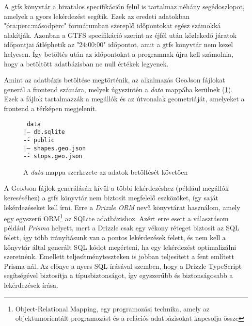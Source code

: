 A gtfs könyvtár a hivatalos specifikáción felül is tartalmaz néhány segédoszlopot, amelyek a gyors lekérdezést segítik. Ezek az eredeti adatokban "óra:perc:másodperc" formátumban szereplő időpontokat egész számokká alakítják. Azonban a GTFS specifikáció szerint az éjfél után közlekedő járatok időpontjai átléphetik az "24:00:00" időpontot, amit a gtfs könyvtár nem kezel helyesen. Így betöltés után az időpontokat a programnak újra kell számolnia, hogy a betöltött adatbázisban ne null értékek legyenek.

Amint az adatbázis betöltése megtörténik, az alkalmazás GeoJson fájlokat generál a frontend számára, melyek úgyszintén a \textit{data} mappába kerülnek (\ref{fig:data-folder-structure}). Ezek a fájlok tartalmazzák a megállók és az útvonalak geometriáját\cite{rfc7946}, amelyeket a frontend a térképen megjelenít.

\begin{figure}[H]
    \texttt{
        data\\
        |-- db.sqlite\\
        \'-- public\\
        \hspace{1em} |-- shapes.geo.json\\
        \hspace{1em} \'-- stops.geo.json
    }
    \caption{A \textit{data} mappa szerkezete az adatok betöltését követően}
    \label{fig:data-folder-structure}
\end{figure}

A GeoJson fájlok generálásán kívül a többi lekérdezéshez (például megállók kereséséhez) a gtfs könyvtár nem biztosít megfelelő eszközöket, így saját lekérdezéseket kell írni. Erre a \textit{Drizzle ORM} nevű könyvtárat használom, amely egy egyszerű ORM\footnote{Object-Relational Mapping, egy programozási technika, amely az objektumorientált programozást és a relációs adatbázisokat kapcsolja össze} az SQLite adatbázishoz. Azért erre esett a választásom például \textit{Prisma} helyett, mert a Drizzle csak egy vékony réteget biztosít az SQL felett\cite{drizzledocs}, így több irányításunk van a pontos lekérdezések felett, és nem kell a könyvtár által generált SQL kódot megérteni, ha egy lekérdezést optimalizálni szeretnénk. Emellett teljesítményteszteken is jobban teljesített a fent említett Prisma-nál\cite{drizzlebenchmark}. Az előnye a nyers SQL írásával szemben, hogy a Drizzle TypeScript segítségével biztosítja a típusbiztonságot, így egyszerűbb és biztonságosabb a lekérdezések írása.

